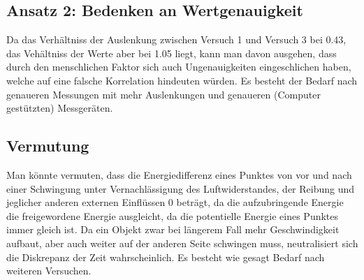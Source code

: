 \documentclass[8pt, letterpaper]{article}
\begin{document}
\subsection{Ansatz 2: Bedenken an Wertgenauigkeit}
Da das Verhältniss der Auslenkung zwischen Versuch 1 und Versuch 3 bei 0.43, das Vehältniss der Werte aber bei 1.05 liegt, kann man davon ausgehen, dass durch den menschlichen Faktor sich auch Ungenauigkeiten eingeschlichen haben, welche auf eine falsche Korrelation hindeuten würden.
Es besteht der Bedarf nach genaueren Messungen mit mehr Auslenkungen und genaueren (Computer gestützten) Messgeräten.

\subsection{Vermutung}
Man könnte vermuten, dass die Energiedifferenz eines Punktes von vor und nach einer Schwingung unter Vernachlässigung des Luftwiderstandes, der Reibung und jeglicher anderen externen Einflüssen 0 beträgt, da die aufzubringende Energie die freigewordene Energie ausgleicht, da die potentielle Energie eines Punktes immer gleich ist. Da ein Objekt zwar bei längerem Fall mehr Geschwindigkeit aufbaut, aber auch weiter auf der anderen Seite schwingen muss, neutralisiert sich die Diskrepanz der Zeit wahrscheinlich. Es besteht wie gesagt Bedarf nach weiteren Versuchen.
\end{document}
